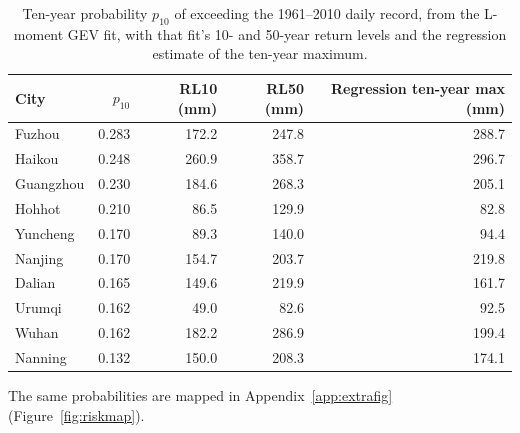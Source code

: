 \begin{table}[H]
\centering
\caption{Ten-year probability $p_{10}$ of exceeding the 1961--2010 daily record, from the L-moment GEV fit, with that fit's 10- and 50-year return levels and the regression estimate of the ten-year maximum.}
\label{tab:risk}
\small
\begin{tabular}{lrrrr}
\toprule
City & $p_{10}$ & RL10 (mm) & RL50 (mm) & Regression ten-year max (mm)\\
\midrule
Fuzhou & 0.283 & 172.2 & 247.8 & 288.7\\
Haikou & 0.248 & 260.9 & 358.7 & 296.7\\
Guangzhou & 0.230 & 184.6 & 268.3 & 205.1\\
Hohhot & 0.210 & 86.5 & 129.9 & 82.8\\
Yuncheng & 0.170 & 89.3 & 140.0 & 94.4\\
Nanjing & 0.170 & 154.7 & 203.7 & 219.8\\
Dalian & 0.165 & 149.6 & 219.9 & 161.7\\
Urumqi & 0.162 & 49.0 & 82.6 & 92.5\\
Wuhan & 0.162 & 182.2 & 286.9 & 199.4\\
Nanning & 0.132 & 150.0 & 208.3 & 174.1\\
\bottomrule
\end{tabular}
\end{table}

The same probabilities are mapped in Appendix~\ref{app:extrafig} (Figure~\ref{fig:riskmap}).
